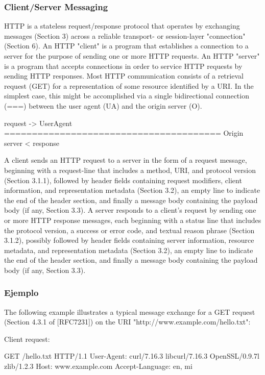 \subsubsection{Client/Server Messaging}
HTTP is a stateless request/response protocol that operates by
exchanging messages (Section 3) across a reliable transport- or
session-layer "connection" (Section 6).  An HTTP "client" is a
program that establishes a connection to a server for the purpose of
sending one or more HTTP requests.  An HTTP "server" is a program
that accepts connections in order to service HTTP requests by sending
HTTP responses.
Most HTTP communication consists of a retrieval request (GET) for a
representation of some resource identified by a URI.  In the simplest
case, this might be accomplished via a single bidirectional
connection (===) between the user agent (UA) and the origin
server (O).

         request   ->
    UserAgent ======================================= Origin server
                                <   response

A client sends an HTTP request to a server in the form of a request
message, beginning with a request-line that includes a method, URI,
and protocol version (Section 3.1.1), followed by header fields
containing request modifiers, client information, and representation
metadata (Section 3.2), an empty line to indicate the end of the
header section, and finally a message body containing the payload
body (if any, Section 3.3).
A server responds to a client's request by sending one or more HTTP
   response messages, each beginning with a status line that includes
   the protocol version, a success or error code, and textual reason
   phrase (Section 3.1.2), possibly followed by header fields containing
   server information, resource metadata, and representation metadata
   (Section 3.2), an empty line to indicate the end of the header
   section, and finally a message body containing the payload body (if
   any, Section 3.3).
\subsubsection{Ejemplo}
The following example illustrates a typical message exchange for a
GET request (Section 4.3.1 of [RFC7231]) on the URI
"http://www.example.com/hello.txt":

Client request:

  GET /hello.txt HTTP/1.1
  User-Agent: curl/7.16.3 libcurl/7.16.3 OpenSSL/0.9.7l zlib/1.2.3
  Host: www.example.com
  Accept-Language: en, mi



